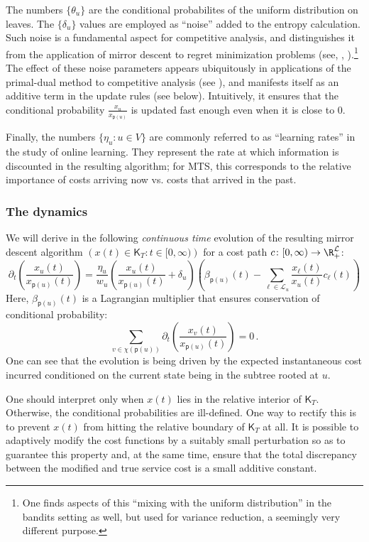 \documentclass{toc}
\newcommand{\calL}{\mathcal L}
\newcommand{\sfp}{\mathsf{p}}
\newcommand{\sfK}{\mathsf K}
\begin{document}
The numbers $\{\theta_u\}$ are the conditional probabilites of the uniform distribution on leaves.
The $\{\delta_u\}$ values
are employed as ``noise'' added to the entropy calculation.
Such noise is a fundamental aspect for competitive analysis, and distinguishes it from the application
of mirror descent to regret minimization problems (see, \eg, \cite{BN12}).\footnote{One finds aspects of this ``mixing with the uniform distribution''
	in the bandits setting as well, but used for variance reduction, a seemingly very different purpose.}
The effect of these noise parameters appears ubiquitously in applications of the primal-dual method to competitive analysis (see \cite{BN07}),
and manifests itself as an additive term in the update rules (see  below). Intuitively, it ensures that the conditional probability $\frac{x_u}{x_{\sfp(u)}}$ is updated fast enough even when it is close to $0$.

Finally, the numbers $\{\eta_u : u \in V\}$ are commonly referred to as ``learning rates'' in 
the study of online learning.  They represent the rate at which information is discounted in the resulting algorithm;
for MTS, this corresponds to the relative importance of costs arriving now vs. costs that arrived in the past.

\subsubsection{The dynamics}
\label{sec:dyn}

We will derive in  the following \emph{continuous time} evolution of the resulting mirror descent algorithm $\left(x(t) \in \sfK_T : t \in [0,\infty)\right)$ for a cost path $c\colon[0,\infty)\to \R_+^{\calL}$:
\begin{equation}\label{eq:evo}
\partial_t \left(\frac{x_u(t)}{x_{\sfp(u)}(t)}\right) = \frac{\eta_u}{w_u} \left(\frac{x_u(t)}{x_{\sfp(u)}(t)}+\delta_u\right)
\left(\beta_{\sfp(u)}(t) - \sum_{\ell \in \calL_u} \frac{x_{\ell}(t)}{x_u(t)} c_{\ell}(t)\right)
\end{equation}
Here, $\beta_{\sfp(u)}(t)$ is a Lagrangian multiplier that ensures conservation of conditional probability:
\[
\sum_{v \in \chi(\sfp(u))} \partial_t \left(\frac{x_v(t)}{x_{\sfp(u)}(t)}\right) = 0\,.
\]
One can see that the evolution is being driven by the expected instantaneous
cost incurred conditioned on the current state being in the subtree rooted at $u$.

One should interpret  only when $x(t)$ lies in the relative interior of $\sfK_T$. Otherwise,
the conditional probabilities are ill-defined.
One way to rectify this is to
prevent $x(t)$ from hitting the relative boundary of $\sfK_T$ at all.
It is possible to adaptively modify the cost functions by a suitably small perturbation so as to guarantee
this property and, at the same time, ensure that the total discrepancy between
the modified and true service cost
is a small additive constant.
\end{document}
